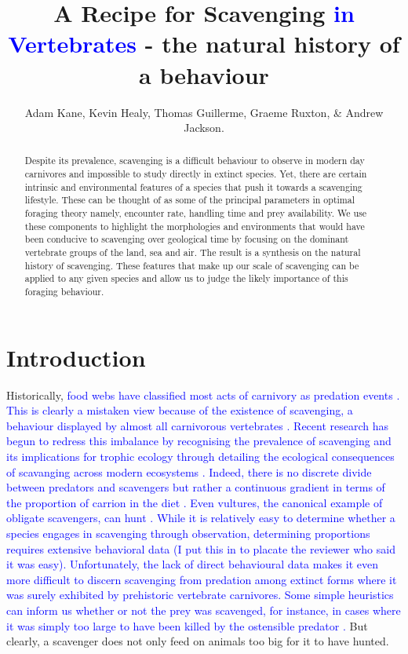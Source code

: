 \documentclass[a4paper,12pt]{article}
\title{A Recipe for Scavenging \textcolor{blue}{in Vertebrates} - the natural history of a behaviour}
\author{Adam Kane, Kevin Healy, Thomas Guillerme, Graeme Ruxton, \& Andrew Jackson.}
\begin{document}
\maketitle


\begin{abstract} 
Despite its prevalence, scavenging is a difficult behaviour to observe in modern day carnivores and impossible to study directly in extinct species. 
Yet, there are certain intrinsic and environmental features of a species that push it towards a scavenging lifestyle. 
These can be thought of as some of the principal parameters in optimal foraging theory namely, encounter rate, handling time and prey availability. 
We use these components to highlight the morphologies and environments that would have been conducive to scavenging over geological time by focusing on the dominant vertebrate groups of the land, sea and air. 
The result is a synthesis on the natural history of scavenging. 
These features that make up our scale of scavenging can be applied to any given species and allow us to judge the likely importance of this foraging behaviour. 
\end{abstract}

\newpage


\section{Introduction}

Historically, \textcolor{blue}{food webs have classified most acts of carnivory as predation events \citep{wilson2011scavenging}. 
This is clearly a mistaken view because of the existence of scavenging, a behaviour displayed by almost all carnivorous vertebrates \citep{devault2003scavenging}. 
Recent research has begun to redress this imbalance by recognising the prevalence of scavenging and its implications for trophic ecology through detailing the ecological consequences of scavanging across modern ecosystems \citep{pereira2014facultative,periquet2015lion}.
Indeed, there is no discrete divide between predators and scavengers but rather a continuous gradient in terms of the proportion of carrion in the diet \citep{pereira2014facultative}.
Even vultures, the canonical example of obligate scavengers, can hunt \citep{margalida2011scavenger}. While it is relatively easy to determine whether a species engages in scavenging through observation, determining proportions requires extensive behavioral data (I put this in to placate the reviewer who said it was easy).
Unfortunately, the lack of direct behavioural data makes it even more difficult to discern scavenging from predation among extinct forms where it was surely exhibited by prehistoric vertebrate carnivores.
Some simple heuristics can inform us whether or not the prey was scavenged, for instance, in cases where it was simply too large to have been killed by the ostensible predator \citep{pobiner2008paleoecological}.}
But clearly, a scavenger does not only feed on animals too big for it to have hunted.
\end{document}
